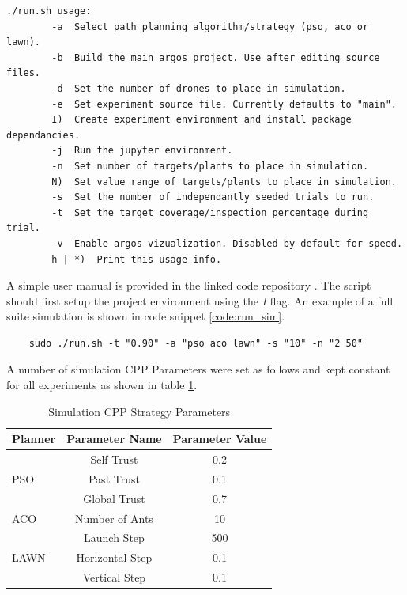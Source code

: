 \documentclass{report}
\newenvironment{code}{\captionsetup{type=listing}}{}
\begin{document}
\begin{code}
\begin{verbatim}
./run.sh usage:
        -a  Select path planning algorithm/strategy (pso, aco or lawn).
        -b  Build the main argos project. Use after editing source files.
        -d  Set the number of drones to place in simulation.
        -e  Set experiment source file. Currently defaults to "main".
        I)  Create experiment environment and install package dependancies.
        -j  Run the jupyter environment.
        -n  Set number of targets/plants to place in simulation.
        N)  Set value range of targets/plants to place in simulation.
        -s  Set the number of independantly seeded trials to run.
        -t  Set the target coverage/inspection percentage during trial.
        -v  Enable argos vizualization. Disabled by default for speed.
        h | *)  Print this usage info.
\end{verbatim}
\label{code:script_help}
\end{code}
\vspace{1cm}

A simple user manual is provided in the linked code repository \cite{SWARMCODE}. The script should first setup the project environment using the \textit{I} flag. An example of a full suite simulation is shown in code snippet \ref{code:run_sim}.

\begin{code}
\begin{verbatim}
	sudo ./run.sh -t "0.90" -a "pso aco lawn" -s "10" -n "2 50"
\end{verbatim}
\label{code:run_sim}
\end{code}
\vspace{1cm}

A number of simulation CPP Parameters were set as follows and kept constant for all experiments as shown in table \ref{tab:sim_cpp_params}.

\bgroup
\def\arraystretch{1.5}%
\begin{table}[h]
  \centering
  \begin{tabular}{|l|c|c|}
  \hline
  \textbf{Planner} & \textbf{Parameter Name} & \textbf{Parameter Value} \\
  \hline
  \multirow{3}{*}{PSO} & Self Trust & 0.2 \\
	& Past Trust & 0.1 \\
	& Global Trust & 0.7 \\
  \hline
  ACO & Number of Ants & 10 \\
  \hline
  \multirow{3}{*}{LAWN} & Launch Step & 500 \\
	& Horizontal Step & 0.1 \\
	& Vertical Step & 0.1 \\
  \hline
  \end{tabular}
  \caption{Simulation CPP Strategy Parameters}
  \label{tab:sim_cpp_params}
\end{table}
\egroup
\end{document}
